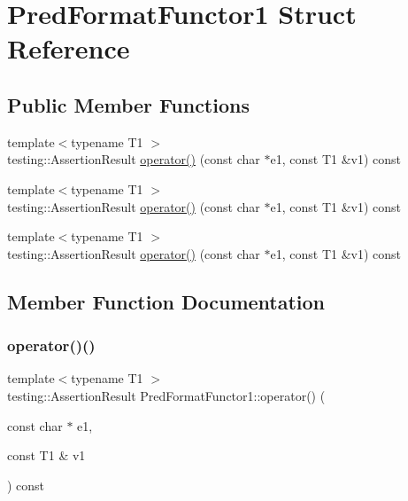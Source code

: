 \hypertarget{struct_pred_format_functor1}{}\section{Pred\+Format\+Functor1 Struct Reference}
\label{struct_pred_format_functor1}
\subsection*{Public Member Functions}
\begin{DoxyCompactItemize}
\item 
{\footnotesize template$<$typename T1 $>$ }\\testing\+::\+Assertion\+Result \mbox{\hyperlink{struct_pred_format_functor1_ac2c414b5fa65b41b0ab5967f9f1e5bff}{operator()}} (const char $\ast$e1, const T1 \&v1) const
\item 
{\footnotesize template$<$typename T1 $>$ }\\testing\+::\+Assertion\+Result \mbox{\hyperlink{struct_pred_format_functor1_ac2c414b5fa65b41b0ab5967f9f1e5bff}{operator()}} (const char $\ast$e1, const T1 \&v1) const
\item 
{\footnotesize template$<$typename T1 $>$ }\\testing\+::\+Assertion\+Result \mbox{\hyperlink{struct_pred_format_functor1_ac2c414b5fa65b41b0ab5967f9f1e5bff}{operator()}} (const char $\ast$e1, const T1 \&v1) const
\end{DoxyCompactItemize}


\subsection{Member Function Documentation}
\mbox{\label{struct_pred_format_functor1_ac2c414b5fa65b41b0ab5967f9f1e5bff}} 
\subsubsection{\texorpdfstring{operator()()}{operator()()}\hspace{0.1cm}{\footnotesize\ttfamily [1/3]}}
{\footnotesize\ttfamily template$<$typename T1 $>$ \\
testing\+::\+Assertion\+Result Pred\+Format\+Functor1\+::operator() (\begin{DoxyParamCaption}\item[{const char $\ast$}]{e1,  }\item[{const T1 \&}]{v1 }\end{DoxyParamCaption}) const\hspace{0.3cm}{\ttfamily [inline]}}

